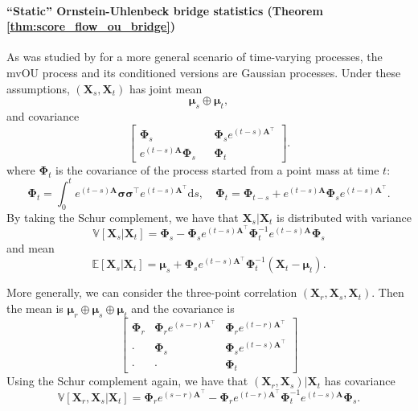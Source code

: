 \documentclass{article}
\newcommand{\diff}{\mathrm{d}}
\newcommand{\E}{\mathbb{E}}
\newcommand{\V}{\mathbb{V}}
\theoremstyle{newstyle}
\begin{document}
\paragraph{``Static'' Ornstein-Uhlenbeck bridge statistics (Theorem \ref{thm:score_flow_ou_bridge})}
As was studied by \cite{chen2015stochastic} for a more general scenario of time-varying processes, the mvOU process and its conditioned versions are Gaussian processes. Under these assumptions, $(\bm{X}_s, \bm{X}_t)$ has joint mean
\begin{equation}
  \bm{\mu}_s \oplus \bm{\mu}_t,
\end{equation}
and covariance
\begin{equation}
  \begin{bmatrix}
    \bm{\Phi}_s && \bm{\Phi}_s e^{(t-s) \bm{A}^\top} \\
    e^{(t-s) \bm{A}} \bm{\Phi}_s && \bm{\Phi}_t
  \end{bmatrix}. 
\end{equation}
where $\bm{\Phi}_t$ is the covariance of the process started from a point mass at time $t$:
\begin{equation}
  \bm{\Phi}_t = \int_0^t e^{(t-s)\bm{A}} \bm{\sigma}\bm{\sigma}^\top e^{(t-s)\bm{A}^\top} \diff s, \quad \bm{\Phi}_t = \bm{\Phi}_{t-s} + e^{(t-s)\bm{A}} \bm{\Phi}_{s} e^{(t-s)\bm{A}^\top}. 
\end{equation}
By taking the Schur complement, we have that $\bm{X}_s | \bm{X}_t$ is distributed with variance 
\begin{equation}
  \V[\bm{X}_s | \bm{X}_t] = \bm{\Phi}_s - \bm{\Phi}_s e^{(t-s) \bm{A}^\top} \bm{\Phi}_t^{-1} e^{(t-s) \bm{A}} \bm{\Phi}_s
\end{equation}
and mean 
\begin{equation}
  \E[\bm{X}_s | \bm{X}_t] = \bm{\mu}_s + \bm{\Phi}_s e^{(t-s) \bm{A}^\top} \bm{\Phi}_t^{-1} (\bm{X}_t - \bm{\mu}_t). 
\end{equation}

More generally, we can consider the three-point correlation $(\bm{X}_r, \bm{X}_s, \bm{X}_t)$. Then the mean is $\bm{\mu}_r \oplus \bm{\mu}_s \oplus \bm{\mu}_t$ and the covariance is
\begin{equation}
  \begin{bmatrix}
    \bm{\Phi}_r & \bm{\Phi}_r e^{(s-r) \bm{A}^\top} & \bm{\Phi}_r e^{(t-r) \bm{A}^\top} \\
    \cdot & \bm{\Phi}_s & \bm{\Phi}_s e^{(t-s) \bm{A}^\top} \\
    \cdot & \cdot & \bm{\Phi}_t 
  \end{bmatrix}
\end{equation}
Using the Schur complement again, we have that $(\bm{X}_r, \bm{X}_s) | \bm{X}_t$ has covariance
\begin{equation}
  \V[\bm{X}_r, \bm{X}_s | \bm{X}_t] = \bm{\Phi}_r e^{(s-r)\bm{A}^\top} - \bm{\Phi}_r e^{(t-r) \bm{A}^\top} \bm{\Phi}_t^{-1} e^{(t-s) \bm{A}} \bm{\Phi}_s.  \label{eq:mvOU_bridge_covariance}
\end{equation}
\end{document}
